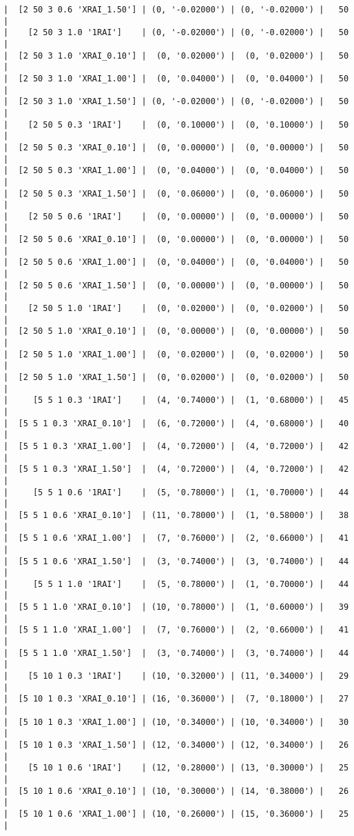 \documentclass{article}
\begin{document}
\begin{verbatim}
|  [2 50 3 0.6 'XRAI_1.50'] | (0, '-0.02000') | (0, '-0.02000') |   50  |
|    [2 50 3 1.0 '1RAI']    | (0, '-0.02000') | (0, '-0.02000') |   50  |
|  [2 50 3 1.0 'XRAI_0.10'] |  (0, '0.02000') |  (0, '0.02000') |   50  |
|  [2 50 3 1.0 'XRAI_1.00'] |  (0, '0.04000') |  (0, '0.04000') |   50  |
|  [2 50 3 1.0 'XRAI_1.50'] | (0, '-0.02000') | (0, '-0.02000') |   50  |
|    [2 50 5 0.3 '1RAI']    |  (0, '0.10000') |  (0, '0.10000') |   50  |
|  [2 50 5 0.3 'XRAI_0.10'] |  (0, '0.00000') |  (0, '0.00000') |   50  |
|  [2 50 5 0.3 'XRAI_1.00'] |  (0, '0.04000') |  (0, '0.04000') |   50  |
|  [2 50 5 0.3 'XRAI_1.50'] |  (0, '0.06000') |  (0, '0.06000') |   50  |
|    [2 50 5 0.6 '1RAI']    |  (0, '0.00000') |  (0, '0.00000') |   50  |
|  [2 50 5 0.6 'XRAI_0.10'] |  (0, '0.00000') |  (0, '0.00000') |   50  |
|  [2 50 5 0.6 'XRAI_1.00'] |  (0, '0.04000') |  (0, '0.04000') |   50  |
|  [2 50 5 0.6 'XRAI_1.50'] |  (0, '0.00000') |  (0, '0.00000') |   50  |
|    [2 50 5 1.0 '1RAI']    |  (0, '0.02000') |  (0, '0.02000') |   50  |
|  [2 50 5 1.0 'XRAI_0.10'] |  (0, '0.00000') |  (0, '0.00000') |   50  |
|  [2 50 5 1.0 'XRAI_1.00'] |  (0, '0.02000') |  (0, '0.02000') |   50  |
|  [2 50 5 1.0 'XRAI_1.50'] |  (0, '0.02000') |  (0, '0.02000') |   50  |
|     [5 5 1 0.3 '1RAI']    |  (4, '0.74000') |  (1, '0.68000') |   45  |
|  [5 5 1 0.3 'XRAI_0.10']  |  (6, '0.72000') |  (4, '0.68000') |   40  |
|  [5 5 1 0.3 'XRAI_1.00']  |  (4, '0.72000') |  (4, '0.72000') |   42  |
|  [5 5 1 0.3 'XRAI_1.50']  |  (4, '0.72000') |  (4, '0.72000') |   42  |
|     [5 5 1 0.6 '1RAI']    |  (5, '0.78000') |  (1, '0.70000') |   44  |
|  [5 5 1 0.6 'XRAI_0.10']  | (11, '0.78000') |  (1, '0.58000') |   38  |
|  [5 5 1 0.6 'XRAI_1.00']  |  (7, '0.76000') |  (2, '0.66000') |   41  |
|  [5 5 1 0.6 'XRAI_1.50']  |  (3, '0.74000') |  (3, '0.74000') |   44  |
|     [5 5 1 1.0 '1RAI']    |  (5, '0.78000') |  (1, '0.70000') |   44  |
|  [5 5 1 1.0 'XRAI_0.10']  | (10, '0.78000') |  (1, '0.60000') |   39  |
|  [5 5 1 1.0 'XRAI_1.00']  |  (7, '0.76000') |  (2, '0.66000') |   41  |
|  [5 5 1 1.0 'XRAI_1.50']  |  (3, '0.74000') |  (3, '0.74000') |   44  |
|    [5 10 1 0.3 '1RAI']    | (10, '0.32000') | (11, '0.34000') |   29  |
|  [5 10 1 0.3 'XRAI_0.10'] | (16, '0.36000') |  (7, '0.18000') |   27  |
|  [5 10 1 0.3 'XRAI_1.00'] | (10, '0.34000') | (10, '0.34000') |   30  |
|  [5 10 1 0.3 'XRAI_1.50'] | (12, '0.34000') | (12, '0.34000') |   26  |
|    [5 10 1 0.6 '1RAI']    | (12, '0.28000') | (13, '0.30000') |   25  |
|  [5 10 1 0.6 'XRAI_0.10'] | (10, '0.30000') | (14, '0.38000') |   26  |
|  [5 10 1 0.6 'XRAI_1.00'] | (10, '0.26000') | (15, '0.36000') |   25  |

\end{verbatim}
\end{document}

